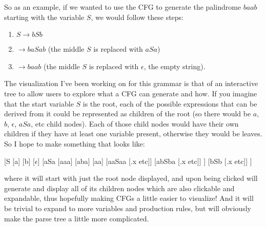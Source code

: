 \documentclass[•]{article}
\begin{document}
So as an example, if we wanted to use the CFG to generate the palindrome $baab$ starting with the variable $S$, we would follow these steps:
\begin{enumerate}
	\item $S \rightarrow bSb$
	\item $ \rightarrow baSab$ (the middle $S$ is replaced with $aSa$)
	\item $ \rightarrow baab$ (the middle $S$ is replaced with $\epsilon$, the empty string).
\end{enumerate}

The visualization I've been working on for this grammar is that of an interactive tree to allow users to explore what a CFG can generate and how. If you imagine that the start variable $S$ is the root, each of the possible expressions that can be derived from it could be represented as children of the root (so there would be $a$, $b$, $\epsilon$, $aSa$, etc child nodes). Each of those child nodes would have their own children if they have at least one variable present, otherwise they would be leaves. So I hope to make something that looks like:

\begin{center}
[S
[a] [b] [$\epsilon$]
[aSa 
	[aaa] [aba] [aa] [aaSaa [.x etc]] [abSba [.x etc]]
	] [bSb [.x etc]]
]
\end{center}

where it will start with just the root node displayed, and upon being clicked will generate and display all of its children nodes which are also clickable and expandable, thus hopefully making CFGs a little easier to visualize! And it will be trivial to expand to more variables and production rules, but will obviously make the parse tree a little more complicated.
\end{document}
